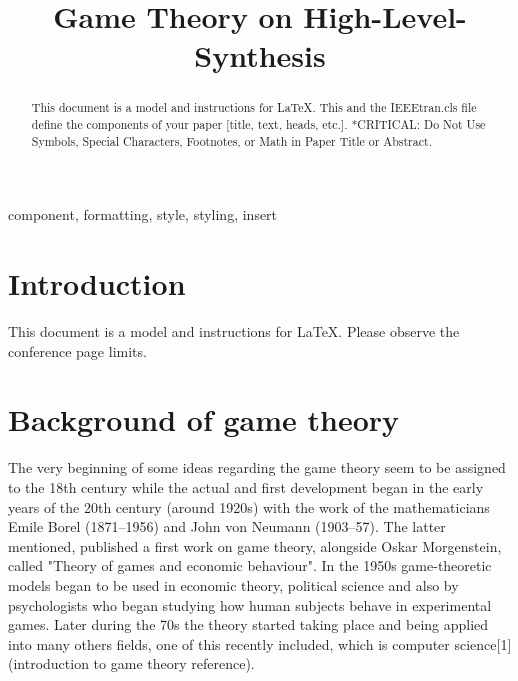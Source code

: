 \documentclass[conference]{IEEEtran}
\begin{document}
\title{Game Theory on High-Level-Synthesis\\
}

\author{

}

\maketitle

\begin{abstract}
This document is a model and instructions for \LaTeX.
This and the IEEEtran.cls file define the components of your paper [title, text, heads, etc.]. *CRITICAL: Do Not Use Symbols, Special Characters, Footnotes, 
or Math in Paper Title or Abstract.
\end{abstract}

\begin{IEEEkeywords}
component, formatting, style, styling, insert
\end{IEEEkeywords}

\section{Introduction}
This document is a model and instructions for \LaTeX.
Please observe the conference page limits. 

\section{Background of game theory}
The very beginning of some ideas regarding the game theory seem to be assigned to the 18th century while the actual and first development began in the early years of the 20th century (around 1920s) with the work of the mathematicians Emile Borel (1871–1956) and John von Neumann (1903–57). The latter mentioned, published a first work on game theory, alongside Oskar Morgenstein, called "Theory of games and economic behaviour". In the 1950s game-theoretic models began to be used in economic theory, political science and also by psychologists who began studying how human subjects behave in experimental games. Later during the 70s the theory started taking place and being applied into many others fields, one of this recently included, which is computer science[1] (introduction to game theory reference).
\end{document}

